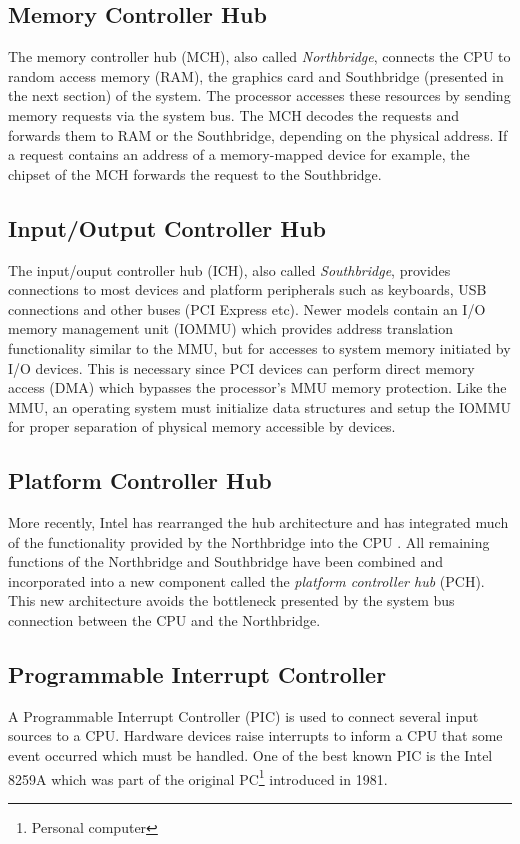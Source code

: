 \subsection{Memory Controller Hub}
The memory controller hub (MCH), also called
\emph{Northbridge}, connects the CPU to random access memory
(RAM), the graphics card and Southbridge (presented in the next section) of the
system. The processor accesses these resources by sending memory requests via
the system bus. The MCH decodes the requests and forwards them to RAM or the
Southbridge, depending on the physical address. If a request contains an address
of a memory-mapped device for example, the chipset of the MCH forwards the
request to the Southbridge.

\subsection{Input/Output Controller Hub}\label{subsec:ich}
The input/ouput controller hub (ICH), also called
\emph{Southbridge}, provides connections to most devices and
platform peripherals such as keyboards, USB connections and other buses (PCI
Express etc). Newer models contain an I/O memory management unit
(IOMMU) which provides address translation functionality similar
to the MMU, but for accesses to system memory initiated by I/O devices.  This is
necessary since PCI devices can perform direct memory access (DMA)
which bypasses the processor's MMU memory protection.  Like the MMU, an
operating system must initialize data structures and setup the IOMMU for proper
separation of physical memory accessible by devices.

\subsection{Platform Controller Hub}
More recently, Intel has rearranged the hub architecture and has integrated much
of the functionality provided by the Northbridge into the CPU \cite{IntelQPI}.
All remaining functions of the Northbridge and Southbridge have been combined
and incorporated into a new component called the \emph{platform controller hub}
(PCH). This new architecture avoids the bottleneck presented by the
system bus connection between the CPU and the Northbridge.

\subsection{Programmable Interrupt Controller}\label{subsec:apic}
A Programmable Interrupt Controller (PIC) is used to connect several
input sources to a CPU. Hardware devices raise interrupts to inform a CPU that
some event occurred which must be handled. One of the best known PIC is the
Intel 8259A which was part of the original PC\footnote{Personal
computer} introduced in 1981.

